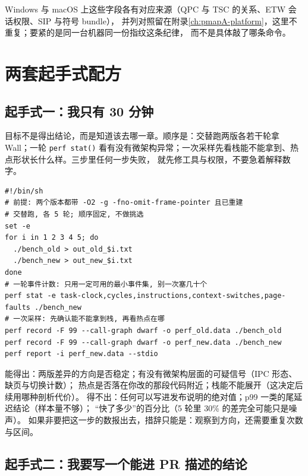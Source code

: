 \documentclass[12pt,a4paper,fontset=fandol]{ctexbook}
\newcommand{\Fn}[1]{\texttt{#1()}}
\newcommand{\Lang}[1]{\textsf{#1}}
\newcommand{\MWall}{\Lang{Wall}}
\newcommand{\Mx}[1]{\textsf{#1}}
\begin{document}
Windows 与 macOS 上这些字段各有对应来源（QPC 与 TSC 的关系、ETW 会话权限、SIP 与符号 bundle），
并列对照留在附录\ref{ch:pmapA-platform}，这里不重复；要紧的是同一台机器同一份指纹这条纪律，
而不是具体敲了哪条命令。

\section{两套起手式配方}
\label{sec:pmapC-recipes}

\subsection{起手式一：我只有 30 分钟}
\label{sub:pmapC-thirtymin}

目标不是得出结论，而是知道该去哪一章。顺序是：交替跑两版各若干轮拿 \MWall；一轮 \Fn{perf stat}
看有没有微架构异常；一次采样先看栈能不能拿到、热点形状长什么样。三步里任何一步失败，
就先修工具与权限，不要急着解释数字。

\begin{lstlisting}[style=shellstyle,caption={30 分钟起手式（Linux 与 perf 形态；另两平台见附录 A）},label={lst:pmapC-thirtymin}]
#!/bin/sh
# 前提: 两个版本都带 -O2 -g -fno-omit-frame-pointer 且已重建
# 交替跑, 各 5 轮; 顺序固定, 不做挑选
set -e
for i in 1 2 3 4 5; do
  ./bench_old > out_old_$i.txt
  ./bench_new > out_new_$i.txt
done
# 一轮事件计数: 只用一定可用的最小事件集, 别一次塞几十个
perf stat -e task-clock,cycles,instructions,context-switches,page-faults ./bench_new
# 一次采样: 先确认能不能拿到栈, 再看热点在哪
perf record -F 99 --call-graph dwarf -o perf_old.data ./bench_old
perf record -F 99 --call-graph dwarf -o perf_new.data ./bench_new
perf report -i perf_new.data --stdio
\end{lstlisting}

\begin{compare}[title={30 分钟能得出什么、得不出什么}]
能得出：两版差异的方向是否稳定；有没有微架构层面的可疑信号（\Mx{IPC} 形态、缺页与切换计数）；
热点是否落在你改的那段代码附近；栈能不能展开（这决定后续用哪种剖析代价）。
得不出：任何可以写进发布说明的绝对值；\Mx{p99} 一类的尾延迟结论（样本量不够）；
``快了多少''的百分比（5 轮里 30\% 的差完全可能只是噪声）。
如果非要把这一步的数报出去，措辞只能是：观察到方向，还需要重复次数与区间。
\end{compare}

\subsection{起手式二：我要写一个能进 PR 描述的结论}
\label{sub:pmapC-pr}
\end{document}
